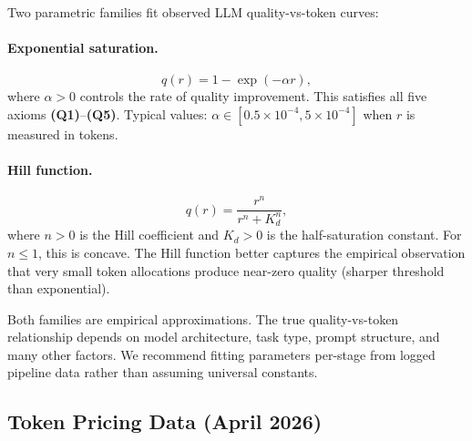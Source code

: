 \documentclass[11pt, a4paper, logo, copyright]{googledeepmind}
\begin{document}
Two parametric families fit observed LLM quality-vs-token curves:

\paragraph{Exponential saturation.}
\begin{equation}\label{eq:exp-sat}
    q(r) = 1 - \exp(-\alpha r),
\end{equation}
where $\alpha > 0$ controls the rate of quality improvement. This satisfies all five axioms \textbf{(Q1)}--\textbf{(Q5)}. Typical values: $\alpha \in [0.5 \times 10^{-4}, 5 \times 10^{-4}]$ when $r$ is measured in tokens.

\paragraph{Hill function.}
\begin{equation}\label{eq:hill}
    q(r) = \frac{r^n}{r^n + K_d^n},
\end{equation}
where $n > 0$ is the Hill coefficient and $K_d > 0$ is the half-saturation constant. For $n \leq 1$, this is concave. The Hill function better captures the empirical observation that very small token allocations produce near-zero quality (sharper threshold than exponential).

Both families are empirical approximations. The true quality-vs-token relationship depends on model architecture, task type, prompt structure, and many other factors. We recommend fitting parameters per-stage from logged pipeline data rather than assuming universal constants.

\subsection{Token Pricing Data (April 2026)}
\end{document}
